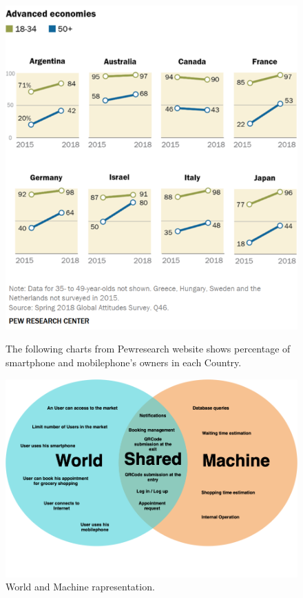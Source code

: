 \begin{figure}[H]
  {\includegraphics[scale=0.55]{images/statistics_smartphone2.png}\label{fig:f2}}
  \caption{The following charts from Pewresearch website shows percentage of smartphone and mobilephone's owners in each Country.}
\end{figure}

\begin{figure}[H]
  \caption{World and Machine rapresentation.}
  \centering
  \includegraphics[scale = 0.38]{diagrams/VENN.png}
\end{figure}
\par

